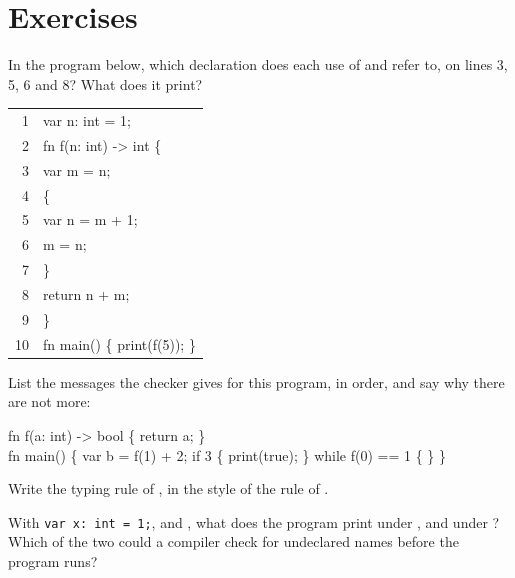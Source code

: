\section{Exercises}\label{sec:b3:semantic-analysis:exercises}

\begin{exercise}[$\star$]\label{exo:b3:semantic-analysis:1}
In the program below, which declaration does each use of  and  refer to, on lines 3, 5, 6 and 8? What does it print?
\begin{center}\small\ttfamily\frenchspacing\begin{tabular}{rl}
1 & var n: int = 1;\\
2 & fn f(n: int) -> int \{\\
3 & \quad var m = n;\\
4 & \quad \{\\
5 & \quad\quad var n = m + 1;\\
6 & \quad\quad m = n;\\
7 & \quad \}\\
8 & \quad return n + m;\\
9 & \}\\
10 & fn main() \{ print(f(5)); \}
\end{tabular}\end{center}
\end{exercise}

\begin{exercise}[$\star$]\label{exo:b3:semantic-analysis:2}
List the messages the checker gives for this program, in order, and say why there are not more:
\begin{center}\small\ttfamily\frenchspacing fn f(a: int) -> bool \{ return a; \}\\ fn main() \{ var b = f(1) + 2; if 3 \{ print(true); \} while f(0) == 1 \{ \} \}\end{center}
\end{exercise}

\begin{exercise}[$\star$]\label{exo:b3:semantic-analysis:3}
Write the typing rule of , in the style of the rule of .
\end{exercise}

\begin{exercise}[$\star$]\label{exo:b3:semantic-analysis:4}
With \texttt{var x:\ int = 1;},  and , what does the program print under , and under ? Which of the two could a compiler check for undeclared names before the program runs?
\end{exercise}

